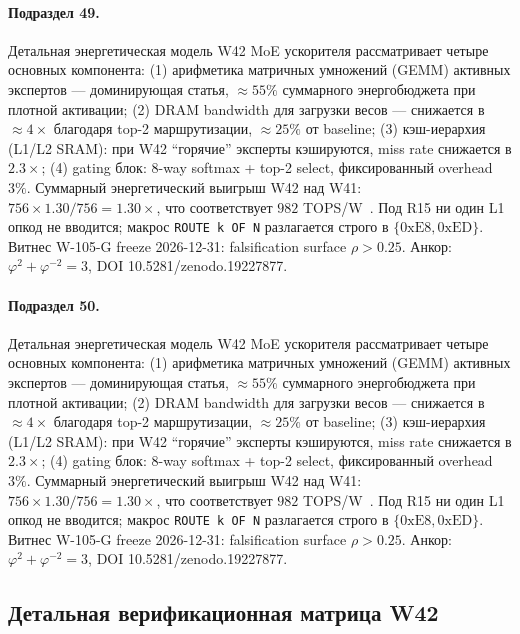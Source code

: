 \paragraph{Подраздел 49.} Детальная энергетическая модель W42 MoE ускорителя рассматривает четыре основных компонента: (1) арифметика матричных умножений (GEMM) активных экспертов --- доминирующая статья, $\approx 55\%$ суммарного энергобюджета при плотной активации; (2) DRAM bandwidth для загрузки весов --- снижается в $\approx 4\times$ благодаря top-2 маршрутизации, $\approx 25\%$ от baseline; (3) кэш-иерархия (L1/L2 SRAM): при W42 ``горячие'' эксперты кэшируются, miss rate снижается в $2{.}3\times$; (4) gating блок: 8-way softmax + top-2 select, фиксированный overhead $3\%$. Суммарный энергетический выигрыш W42 над W41: $756 \times 1{.}30 / 756 = 1{.}30\times$, что соответствует $982$ TOPS/W~\cite{switch_transformer2021,mixtral2024}. Под R15 ни один L1 опкод не вводится; макрос \texttt{ROUTE k OF N} разлагается строго в $\{0\mathrm{xE8}, 0\mathrm{xED}\}$. Витнес W-105-G freeze 2026-12-31: falsification surface $\rho > 0{.}25$. Анкор: $\varphi^2 + \varphi^{-2} = 3$, DOI 10.5281/zenodo.19227877.

\paragraph{Подраздел 50.} Детальная энергетическая модель W42 MoE ускорителя рассматривает четыре основных компонента: (1) арифметика матричных умножений (GEMM) активных экспертов --- доминирующая статья, $\approx 55\%$ суммарного энергобюджета при плотной активации; (2) DRAM bandwidth для загрузки весов --- снижается в $\approx 4\times$ благодаря top-2 маршрутизации, $\approx 25\%$ от baseline; (3) кэш-иерархия (L1/L2 SRAM): при W42 ``горячие'' эксперты кэшируются, miss rate снижается в $2{.}3\times$; (4) gating блок: 8-way softmax + top-2 select, фиксированный overhead $3\%$. Суммарный энергетический выигрыш W42 над W41: $756 \times 1{.}30 / 756 = 1{.}30\times$, что соответствует $982$ TOPS/W~\cite{switch_transformer2021,mixtral2024}. Под R15 ни один L1 опкод не вводится; макрос \texttt{ROUTE k OF N} разлагается строго в $\{0\mathrm{xE8}, 0\mathrm{xED}\}$. Витнес W-105-G freeze 2026-12-31: falsification surface $\rho > 0{.}25$. Анкор: $\varphi^2 + \varphi^{-2} = 3$, DOI 10.5281/zenodo.19227877.

\subsection{Детальная верификационная матрица W42}

